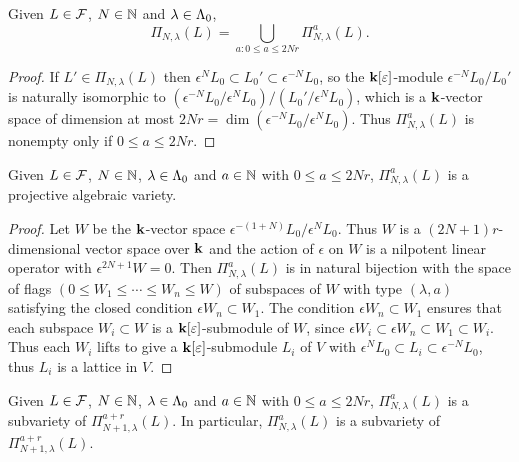 \documentclass[a4paper, 11pt]{report}
\begin{document}
\begin{lemma}
Given $L\in\mathcal{F}$, $N\in\mathbb{N}$ and $\lambda\in{\Lambda_0}$,
\begin{equation*}
\Pi_{N,\lambda}(L) = \bigcup_{a:0\le a\le 2Nr} \Pi_{N,\lambda}^a(L).
\end{equation*}
\end{lemma}

\begin{proof}
If $L'\in\Pi_{N,\lambda}(L)$ then $\epsilon^N L_0\subset L_0'\subset\epsilon^{-N} L_0$, so the $\mathbf{k}[\varepsilon]$-module $\epsilon^{-N} L_0/{L_0'}$ is naturally isomorphic to $(\epsilon^{-N}L_0/{\epsilon^N L_0})/{(L_0'/{\epsilon^N L_0})}$, which is a $\mathbf{k}$-vector space of dimension at most $2Nr = \dim(\epsilon^{-N}L_0/{\epsilon^N L_0})$. Thus $\Pi_{N,\lambda}^a(L)$ is nonempty only if $0\le a\le 2Nr$.
\end{proof}

\begin{lemma}
Given $L\in\mathcal{F}$, $N\in\mathbb{N}$, $\lambda\in{\Lambda_0}$ and $a\in\mathbb{N}$ with $0\le a\le 2Nr$, $\Pi_{N,\lambda}^a(L)$ is a projective algebraic variety.
\end{lemma}

\begin{proof}
Let $W$ be the $\mathbf{k}$-vector space $\epsilon^{-(1+N)}L_0/{\epsilon^N L_0}$. Thus $W$ is a $(2N+1)r$-dimensional vector space over $\mathbf{k}$ and the action of $\epsilon$ on $W$ is a nilpotent linear operator with $\epsilon^{2N+1}W = 0$. Then $\Pi_{N,\lambda}^a(L)$ is in natural bijection with the space of flags $(0\le W_1\le\cdots\le W_n\le W)$ of subspaces of $W$ with type $(\lambda,a)$ satisfying the closed condition $\epsilon W_n\subset W_1$. The condition $\epsilon W_n\subset W_1$ ensures that each subspace $W_i\subset W$ is a $\mathbf{k}[\varepsilon]$-submodule of $W$, since $\epsilon W_i\subset\epsilon W_n\subset W_1\subset W_i$. Thus each $W_i$ lifts to give a $\mathbf{k}[\varepsilon]$-submodule $L_i$ of $V$ with $\epsilon^N L_0 \subset L_i\subset \epsilon^{-N}L_0$, thus $L_i$ is a lattice in $V$.
\end{proof}

\begin{lemma}
Given $L\in\mathcal{F}$, $N\in\mathbb{N}$, $\lambda\in{\Lambda_0}$ and $a\in\mathbb{N}$ with $0\le a\le 2Nr$, $\Pi_{N,\lambda}^a(L)$ is a subvariety of $\Pi_{N+1,\lambda}^{a+r}(L)$. In particular, $\Pi_{N,\lambda}^a(L)$ is a subvariety of $\Pi_{N+1,\lambda}^{a+r}(L)$.
\end{lemma}
\end{document}
